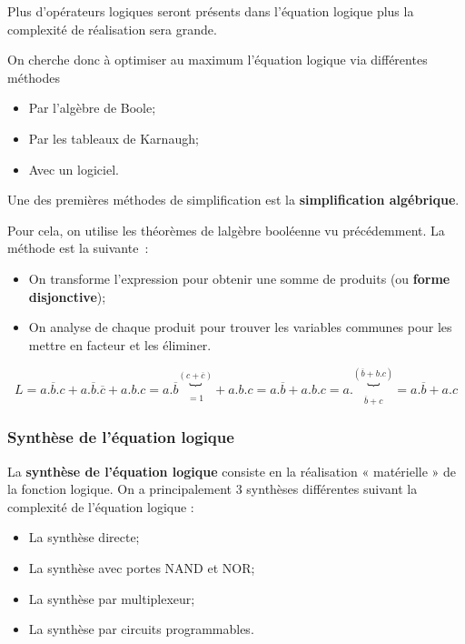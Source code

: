 Plus d'opérateurs logiques seront présents dans l'équation logique plus la complexité de réalisation sera grande.

On cherche donc à optimiser au maximum l'équation logique via différentes méthodes

\begin{itemize}
\item
  Par l'algèbre de Boole;
\item
  Par les tableaux de Karnaugh;
\item
  Avec un logiciel.
\end{itemize}

Une des premières méthodes de simplification est la \textbf{simplification algébrique}.

Pour cela, on utilise les théorèmes de l\textquotesingle algèbre booléenne vu précédemment. La méthode est la suivante~:

\begin{itemize}
\item
  On transforme l'expression pour obtenir une somme de produits (ou \textbf{forme disjonctive});
\item
  On analyse de chaque produit pour trouver les variables communes pour les mettre en facteur et les éliminer.
\end{itemize}

\[L = a.\overline{b}.c + a.\overline{b}.\overline{c} + a.b.c = a.\overline{b}\underset{= 1}{\overset{\left( c + \overline{c} \right)}{︸}} + a.b.c = a.\overline{b} + a.b.c = a.\underset{\overline{b} + c}{\overset{\left( \overline{b} + b.c \right)}{︸}} = \boxed{a.\overline{b} + a.c}\]

\hypertarget{synthuxe8se-de-luxe9quation-logique}{%
\subsubsection{Synthèse de l'équation logique}\label{synthuxe8se-de-luxe9quation-logique}}

La \textbf{synthèse de l'équation logique} consiste en la réalisation « matérielle » de la fonction logique. On a principalement 3 synthèses différentes suivant la complexité de l'équation logique :

\begin{itemize}
\item
  La synthèse directe;
\item
  La synthèse avec portes NAND et NOR;
\item
  La synthèse par multiplexeur;
\item
  La synthèse par circuits programmables.
\end{itemize}

